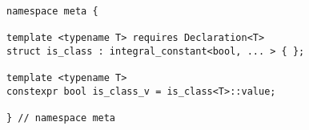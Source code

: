 
\begin{verbatim}
namespace meta {

template <typename T> requires Declaration<T>
struct is_class : integral_constant<bool, ... > { };

template <typename T>
constexpr bool is_class_v = is_class<T>::value;

} // namespace meta
\end{verbatim}
